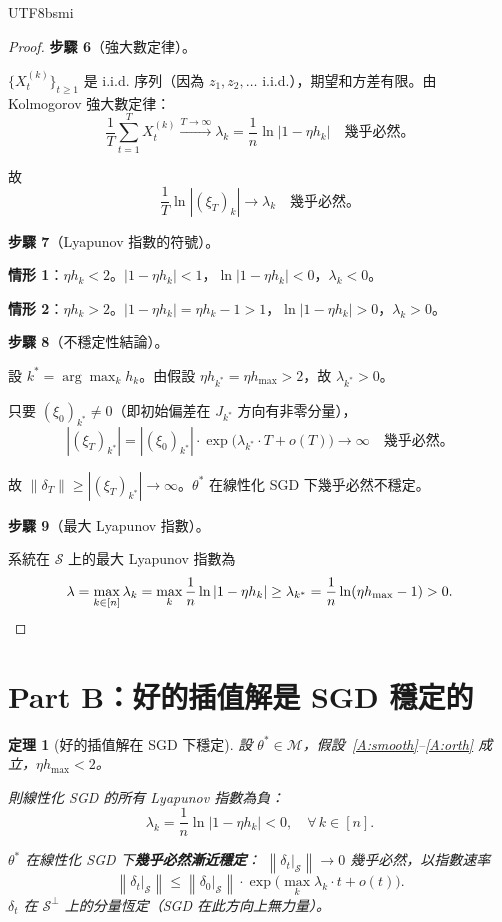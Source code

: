 \documentclass[11pt,a4paper]{article}
\newtheorem{theorem}{定理}
\theoremstyle{definition}
\newcommand{\cM}{\mathcal{M}}
\newcommand{\cS}{\mathcal{S}}
\newcommand{\norm}[1]{\left\|#1\right\|}
\begin{document}
\begin{CJK}{UTF8}{bsmi}
\begin{proof}
  \textbf{步驟 6}（強大數定律）。

  $\{X_t^{(k)}\}_{t\geq 1}$ 是 i.i.d. 序列（因為 $z_1,z_2,\ldots$ i.i.d.），期望和方差有限。由 Kolmogorov 強大數定律：
  \[
    \frac{1}{T}\sum_{t=1}^T X_t^{(k)}\xrightarrow{T\to\infty}\lambda_k=\frac{1}{n}\ln|1-\eta h_k|
    \quad\text{幾乎必然。}
  \]

  故
  \[
    \frac{1}{T}\ln|(\xi_T)_k|\to\lambda_k\quad\text{幾乎必然。}
  \]

  \textbf{步驟 7}（Lyapunov 指數的符號）。

  \textbf{情形 1}：$\eta h_k<2$。$|1-\eta h_k|<1$，$\ln|1-\eta h_k|<0$，$\lambda_k<0$。

  \textbf{情形 2}：$\eta h_k>2$。$|1-\eta h_k|=\eta h_k-1>1$，$\ln|1-\eta h_k|>0$，$\lambda_k>0$。

  \textbf{步驟 8}（不穩定性結論）。

  設 $k^*=\arg\max_k h_k$。由假設 $\eta h_{k^*}=\eta h_{\max}>2$，故 $\lambda_{k^*}>0$。

  只要 $(\xi_0)_{k^*}\neq 0$（即初始偏差在 $J_{k^*}$ 方向有非零分量），
  \[
    |(\xi_T)_{k^*}|=|(\xi_0)_{k^*}|\cdot\exp\!\big(\lambda_{k^*}\cdot T+o(T)\big)\to\infty
    \quad\text{幾乎必然。}
  \]

  故 $\norm{\delta_T}\geq|(\xi_T)_{k^*}|\to\infty$。$\theta^*$ 在線性化 SGD 下幾乎必然不穩定。

  \textbf{步驟 9}（最大 Lyapunov 指數）。

  系統在 $\cS$ 上的最大 Lyapunov 指數為
  \[
    \lambda=\max_{k\in[n]}\lambda_k=\max_k\frac{1}{n}\ln|1-\eta h_k|
    \geq\lambda_{k^*}=\frac{1}{n}\ln(\eta h_{\max}-1)>0. \qedhere
  \]
\end{proof}

\section{Part B：好的插值解是 SGD 穩定的}

\begin{theorem}[好的插值解在 SGD 下穩定]\label{thm:B}
  設 $\theta^*\in\cM$，假設~\ref{A:smooth}--\ref{A:orth} 成立，$\eta h_{\max}<2$。

  則線性化 SGD 的所有 Lyapunov 指數為負：
  \[
    \lambda_k=\frac{1}{n}\ln|1-\eta h_k|<0,\quad\forall\,k\in[n].
  \]

  $\theta^*$ 在線性化 SGD 下\textbf{幾乎必然漸近穩定}：
  $\norm{\delta_t|_\cS}\to 0$ 幾乎必然，以指數速率
  \[
    \norm{\delta_t|_\cS}\leq\norm{\delta_0|_\cS}\cdot\exp\!\Big(\max_k\lambda_k\cdot t+o(t)\Big).
  \]
  $\delta_t$ 在 $\cS^\perp$ 上的分量恆定（SGD 在此方向上無力量）。
\end{theorem}


\end{CJK}
\end{document}
